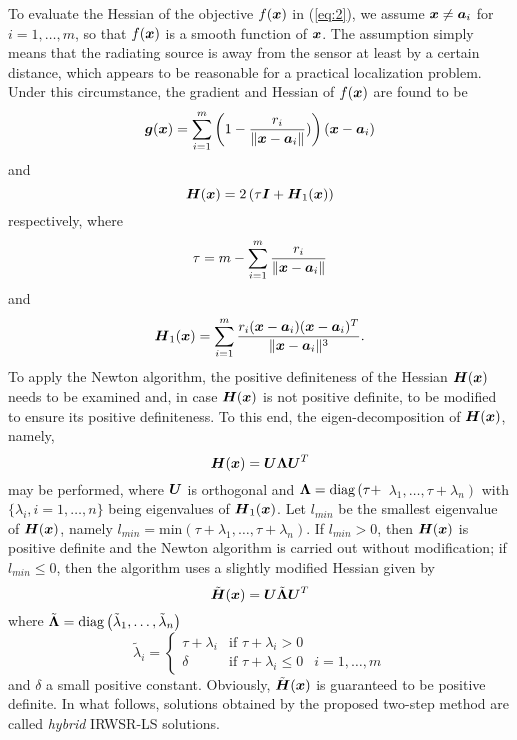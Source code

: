 To evaluate the Hessian of the objective $f(\mbox{\boldmath$x$})$ in (\ref{eq:2}), we assume $\mbox{\boldmath$x$}\neq\mbox{\boldmath$a$}_i$  for $i = 1, \ldots, m$, so that $f(\mbox{\boldmath$x$})$  is a smooth function of $\mbox{\boldmath$x$}$. The assumption simply means that the radiating source is away from the sensor at least by a certain distance, which appears to be reasonable for a practical localization problem. Under this circumstance, the gradient and Hessian of $f(\mbox{\boldmath$x$})$ are found to be
\begin{equation}
\nonumber
\mbox{\boldmath$g$}(\mbox{\boldmath$x$})=\sum_{i=1}^m\left(1-\frac{r_i}{\|\mbox{\boldmath$x$}-\mbox{\boldmath$a$}_i\|})\right)\left(\mbox{\boldmath$x$}-\mbox{\boldmath$a$}_i\right)
\end{equation}
and
\begin{equation}
\nonumber
\mbox{\boldmath$H$}(\mbox{\boldmath$x$})=2\left(\tau\mbox{\boldmath$I$}+\mbox{\boldmath$H$}_1(\mbox{\boldmath$x$})\right)
\end{equation}
respectively, where
\begin{equation}
\nonumber
\tau=m-\sum_{i=1}^m \frac{r_i}{\|\mbox{\boldmath$x$}-\mbox{\boldmath$a$}_i\|}
\end{equation}
and
\begin{equation}
\nonumber
\mbox{\boldmath$H$}_1(\mbox{\boldmath$x$})=\sum_{i=1}^m \frac{r_i(\mbox{\boldmath$x$}-\mbox{\boldmath$a$}_i)(\mbox{\boldmath$x$}-\mbox{\boldmath$a$}_i)^T}{\|\mbox{\boldmath$x$}-\mbox{\boldmath$a$}_i\|^3}.
\end{equation}
To apply the Newton algorithm, the positive definiteness of the Hessian $\mbox{\boldmath$H$}(\mbox{\boldmath$x$})$ needs to be examined and, in case $\mbox{\boldmath$H$}(\mbox{\boldmath$x$})$ is not positive definite, to be modified to ensure its positive definiteness. To this end, the eigen-decomposition of $\mbox{\boldmath$H$}(\mbox{\boldmath$x$})$, namely,
\begin{equation}
\nonumber
\mbox{\boldmath$H$}(\mbox{\boldmath$x$})=\mbox{\boldmath$U$}\mbox{\boldmath{$\Lambda$}}\mbox{\boldmath$U$}^T
\end{equation}
may be performed, where $\mbox{\boldmath$U$}$ is orthogonal and $\mbox{\boldmath{$\Lambda$}}=\mbox{diag}\left(\tau+\right.$ $\left.\lambda_1,\ldots, \tau+\lambda_n\right)$  with $\{\lambda_i,i=1,\ldots,n\}$ being eigenvalues of $\mbox{\boldmath$H$}_1(\mbox{\boldmath$x$})$. Let $l_{min}$  be the smallest eigenvalue of $\mbox{\boldmath$H$}(\mbox{\boldmath$x$})$, namely $l_{min}=\mbox{min}\left(\tau+\lambda_1,\ldots, \tau+\lambda_n\right)$.  If  $l_{min}>0$, then $\mbox{\boldmath$H$}(\mbox{\boldmath$x$})$  is positive definite and the Newton algorithm is carried out without modification; if $l_{min}\leq0$, then the algorithm uses a slightly modified Hessian given by
\begin{equation}
\nonumber
\tilde{\mbox{\boldmath$H$}}(\mbox{\boldmath$x$})=\mbox{\boldmath$U$}\tilde{\mbox{\boldmath{$\Lambda$}}}\mbox{\boldmath$U$}^T
\end{equation}
where $\tilde{\mbox{\boldmath{$\Lambda$}}}=\mbox{diag}\left(\tilde{\lambda}_1,\ldots, \tilde{\lambda}_n\right)$
\begin{equation}
\nonumber
\tilde{\lambda}_i=\left\{\begin{array} {lll}
    \tau+\lambda_i & \mbox{if } \tau+\lambda_i>0 & \\
    \delta &  \mbox{if } \tau+\lambda_i\leq0 & i=1,\ldots,m \end{array} \right.
\end{equation}
and $\delta$ a small positive constant. Obviously, $\tilde{\mbox{\boldmath$H$}}(\mbox{\boldmath$x$})$ is guaranteed to be positive definite. In what follows, solutions obtained by the proposed two-step method are called \textit{hybrid} IRWSR-LS solutions.


